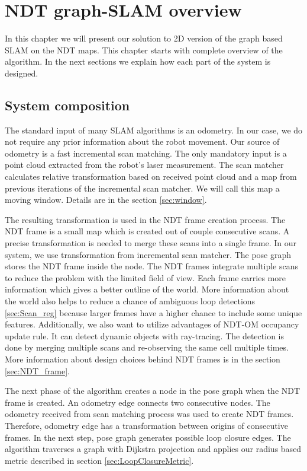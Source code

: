 \chapter{NDT graph-SLAM overview}
In this chapter we will present our solution to 2D version of the graph based \gls{SLAM} on the \gls{NDT} maps. This chapter starts with complete overview of the algorithm. In the next sections we explain how each part of the system is designed.
\section{System composition}
\label{sec:Sys_arch}

The standard input of many \gls{SLAM} algorithms is an odometry. In our case, we do not require any prior information about the robot movement. Our source of odometry is a fast incremental scan matching. The only mandatory input is a point cloud extracted from the robot's laser measurement. The scan matcher calculates relative transformation based on received point cloud and a  map from previous iterations of the incremental scan matcher. We will call this map a moving window. Details are in the section \ref{sec:window}.

The resulting transformation is used in the \gls{NDT} frame creation process. The \gls{NDT} frame is a small map which is created out of couple consecutive scans. A precise transformation is needed to merge these scans into a single frame. In our system, we use transformation from incremental scan matcher. The pose graph stores the \gls{NDT} frame inside the node. The \gls{NDT} frames integrate multiple scans to reduce the problem with the limited field of view. Each frame carries more information which gives a better outline of the world. More information about the world also helps to reduce a chance of ambiguous loop detections \ref{sec:Scan_reg} because larger frames have a higher chance to include some unique features. Additionally, we also want to utilize advantages of \gls{NDT-OM} occupancy update rule. It can detect dynamic objects with ray-tracing. The detection is done by merging multiple scans and re-observing the same cell multiple times.  More information about design choices behind \gls{NDT} frames is in the section \ref{sec:NDT_frame}.

 The next phase of the algorithm creates a node in the pose graph when the \gls{NDT} frame is created.  An odometry edge connects two consecutive nodes. The odometry received from scan matching process was used to create \gls{NDT} frames. Therefore, odometry edge has a transformation between origins of consecutive frames. In the next step, pose graph generates possible loop closure edges. The algorithm traverses a graph with Dijkstra projection and applies our radius based metric described in section \ref{sec:LoopClosureMetric}. 

